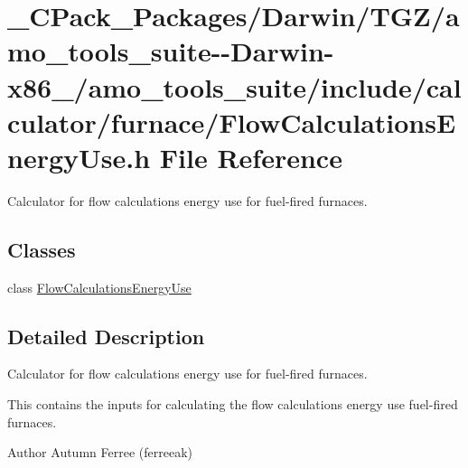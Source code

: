 \hypertarget{___c_pack___packages_2_darwin_2_t_g_z_2amo__tools__suite--_darwin-x86__64_2amo__tools__suite_2inde2a8e32ceba5282a38cc422a4aec49c}{}\section{\+\_\+\+C\+Pack\+\_\+\+Packages/\+Darwin/\+T\+G\+Z/amo\+\_\+tools\+\_\+suite-\/-\/\+Darwin-\/x86\+\_/amo\+\_\+tools\+\_\+suite/include/calculator/furnace/\+Flow\+Calculations\+Energy\+Use.h File Reference}
\label{___c_pack___packages_2_darwin_2_t_g_z_2amo__tools__suite--_darwin-x86__64_2amo__tools__suite_2inde2a8e32ceba5282a38cc422a4aec49c}


Calculator for flow calculations energy use for fuel-\/fired furnaces.  


\subsection*{Classes}
\begin{DoxyCompactItemize}
\item 
class \hyperlink{class_flow_calculations_energy_use}{Flow\+Calculations\+Energy\+Use}
\end{DoxyCompactItemize}


\subsection{Detailed Description}
Calculator for flow calculations energy use for fuel-\/fired furnaces. 

This contains the inputs for calculating the flow calculations energy use fuel-\/fired furnaces.

\begin{DoxyAuthor}{Author}
Autumn Ferree (ferreeak) 
\end{DoxyAuthor}
